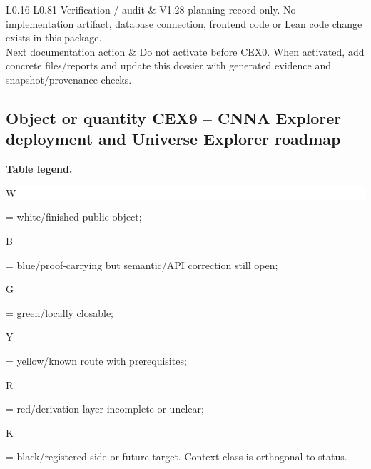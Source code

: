 \begin{longtable}{L{0.16\linewidth} L{0.81\linewidth}}
\hline\addlinespace[0.20em]
Verification /\allowbreak{} audit & V1.28 planning record only. No implementation artifact, database connection, frontend code or Lean code change exists in this package.\\
\hline\addlinespace[0.20em]
Next documentation action & Do not activate before CEX0. When activated, add concrete files/\allowbreak{}reports and update this dossier with generated evidence and snapshot/\allowbreak{}provenance checks.\\
\hline\addlinespace[0.20em]
\end{longtable}
\subsection*{Object or quantity CEX9 -- CNNA Explorer deployment and Universe Explorer roadmap}
\hypertarget{objproof:CEX9}{}
\par\smallskip\noindent\begin{minipage}{0.99\linewidth}\footnotesize\raggedright\textbf{Table legend.} \colorbox{white}{\strut W} = white/finished public object; \colorbox{cyan!20}{\strut B} = blue/proof-carrying but semantic/API correction still open; \colorbox{green!18}{\strut G} = green/locally closable; \colorbox{yellow!25}{\strut Y} = yellow/known route with prerequisites; \colorbox{red!20}{\strut R} = red/derivation layer incomplete or unclear; \colorbox{black!18}{\strut K} = black/registered side or future target. Context class is orthogonal to status.\end{minipage}\par\vspace{0.25em}
